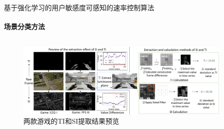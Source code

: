 \documentclass{beamer}
\begin{document}
\begin{frame}[fragile]{基于强化学习的用户敏感度可感知的速率控制算法}
\framesubtitle{场景分类方法}
\begin{columns}
    \begin{column}{0.5\textwidth}
        \begin{figure} [ht]
                \centering
                \includegraphics[width=\textwidth]{figures/chap03/intra_schematic_diagram.pdf} 
                \caption{两款游戏的TI和SI提取结果预览}
                \label{fig_intra_schematic_diagram}
                \end{figure}  
    \end{column}

    \begin{column}{0.5\textwidth}
        
        
    \end{column}
\end{columns}



                

\end{frame}
\end{document}
